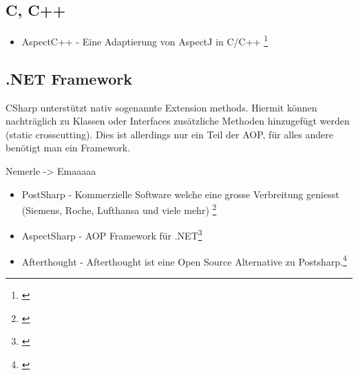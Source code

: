 \subsection{C, C++}

\begin{itemize}
\item AspectC++ - Eine Adaptierung von AspectJ in C/C++ \footnote{\cite{net:apectc}}
\end{itemize}

\subsection{.NET Framework}

CSharp unterstützt nativ sogenannte Extension methods. Hiermit können nachträglich zu Klassen oder Interfaces zusätzliche Methoden hinzugefügt werden (static crosscutting). Dies ist allerdings nur ein Teil der AOP, für alles andere benötigt man ein Framework.

Nemerle -> Emaaaaa

\begin{itemize}
\item PostSharp - Kommerzielle Software welche eine grosse Verbreitung geniesst (Siemens, Roche, Lufthansa und viele mehr) \footnote{\cite{net:postsharp}}
\item AspectSharp - AOP Framework für .NET\footnote{\cite{net:aspectsharp}}
\item Afterthought - Afterthought ist eine Open Source Alternative zu Postsharp.\footnote{\cite{net:afterthought}}
\end{itemize}